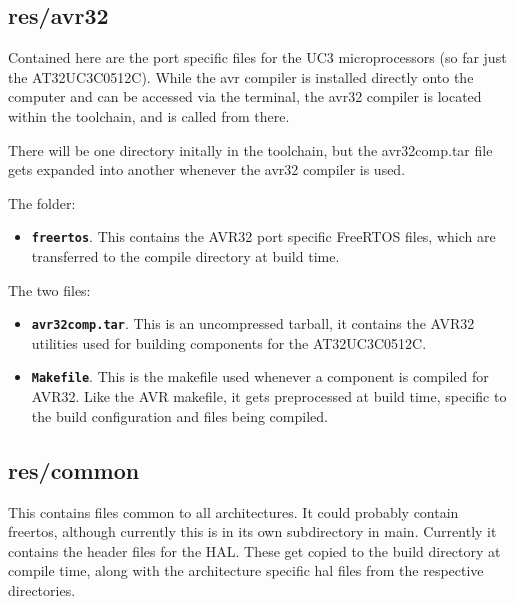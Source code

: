 \documentclass[a4paper, oneside, 11pt, titlepage, onecolumn, openright]{report}
\begin{document}
\subsection{res/avr32}
			\label{ss:res/avr32}
			
Contained here are the port specific files for the UC3 microprocessors (so far just the AT32UC3C0512C).
While the avr compiler is installed directly onto the computer and can be accessed via the terminal, the avr32 compiler is located within the toolchain, and is called from there. 

There will be one directory initally in the toolchain, but the avr32comp.tar file gets expanded into another whenever the avr32 compiler is used.

The folder:

\begin{itemize}

\item \textbf{\texttt{freertos}}. This contains the AVR32 port specific FreeRTOS files, which are transferred to the compile directory at build time.

\end{itemize}

The two files:

\begin{itemize}

\item \textbf{\texttt{avr32comp.tar}}. This is an uncompressed tarball, it contains the AVR32 utilities used for building components for the AT32UC3C0512C.

\item \textbf{\texttt{Makefile}}. This is the makefile used whenever a component is compiled for AVR32. Like the AVR makefile, it gets preprocessed at build time, specific to the build configuration and files being compiled.

\end{itemize}

\subsection{res/common}
			\label{ss:res/commmon}
			This contains files common to all architectures. It could probably contain freertos, although currently this is in its own subdirectory in main. Currently it contains the header files for the HAL. These get copied to the build directory at compile time, along with the architecture specific hal files from the respective directories.
			
\end{document}
